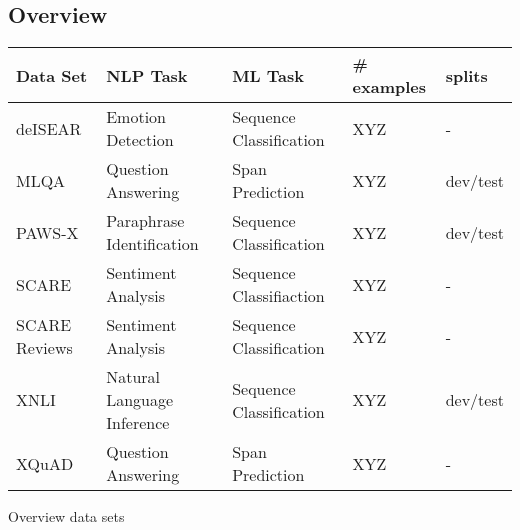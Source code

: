 \cite{artetxe2019cross}

\subsection{Overview}

{\begin{tabular}{l|llll}
	Data Set & NLP Task  & ML Task  & \# examples & splits \\
	\hline
	deISEAR &  Emotion Detection & Sequence Classification  & XYZ & - \\
	MLQA & Question Answering & Span Prediction & XYZ & dev/test \\
	PAWS-X & Paraphrase Identification & Sequence Classification & XYZ & dev/test \\
	SCARE & Sentiment Analysis & Sequence Classifiaction & XYZ & - \\
	SCARE Reviews &  Sentiment Analysis & Sequence Classification & XYZ & - \\
	XNLI & Natural Language Inference & Sequence Classification &  XYZ & dev/test \\
	XQuAD & Question Answering & Span Prediction & XYZ & - \\
\end{tabular}
}{Overview data sets}

